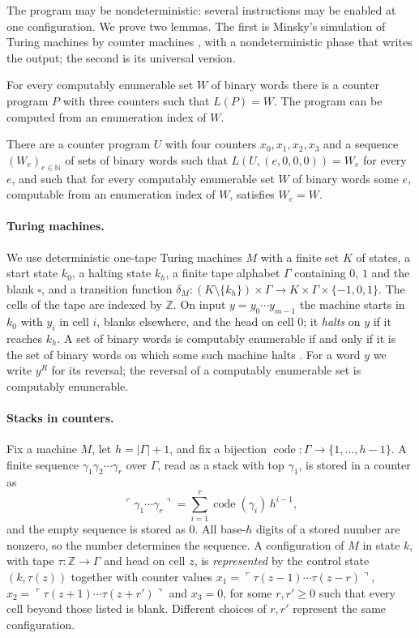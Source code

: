 \documentclass[11pt]{article}
\theoremstyle{plain}
\theoremstyle{definition}
\theoremstyle{remark}
\newcommand{\N}{\mathbb N}
\newcommand{\st}[1]{\ulcorner #1\urcorner}
\newcommand{\code}{\operatorname{code}}
\begin{document}
The program may be nondeterministic: several instructions may be enabled at one configuration. We prove two lemmas. The first is Minsky's simulation of Turing machines by counter machines \cite{Min61,Min67}, with a nondeterministic phase that writes the output; the second is its universal version.

\begin{lemma}\label{lem:program}
For every computably enumerable set $W$ of binary words there is a counter program $P$ with three counters such that $L(P)=W$. The program can be computed from an enumeration index of $W$.
\end{lemma}

\begin{lemma}\label{lem:universal}
There are a counter program $U$ with four counters $x_0,x_1,x_2,x_3$ and a sequence $(W_e)_{e\in\N}$ of sets of binary words such that $L(U,(e,0,0,0))=W_e$ for every $e$, and such that for every computably enumerable set $W$ of binary words some $e$, computable from an enumeration index of $W$, satisfies $W_e=W$.
\end{lemma}

\paragraph{Turing machines.} We use deterministic one-tape Turing machines $M$ with a finite set $K$ of states, a start state $k_0$, a halting state $k_h$, a finite tape alphabet $\Gamma$ containing $0$, $1$ and the blank $\square$, and a transition function $\delta_M\colon(K\setminus\{k_h\})\times\Gamma\to K\times\Gamma\times\{-1,0,1\}$. The cells of the tape are indexed by $\mathbb Z$. On input $y=y_0\cdots y_{m-1}$ the machine starts in $k_0$ with $y_i$ in cell $i$, blanks elsewhere, and the head on cell $0$; it \emph{halts} on $y$ if it reaches $k_h$. A set of binary words is computably enumerable if and only if it is the set of binary words on which some such machine halts \cite{Soa16}. For a word $y$ we write $y^R$ for its reversal; the reversal of a computably enumerable set is computably enumerable.

\paragraph{Stacks in counters.} Fix a machine $M$, let $h=|\Gamma|+1$, and fix a bijection $\code\colon\Gamma\to\{1,\dots,h-1\}$. A finite sequence $\gamma_1\gamma_2\cdots\gamma_r$ over $\Gamma$, read as a stack with top $\gamma_1$, is stored in a counter as
\[
\st{\gamma_1\cdots\gamma_r}=\sum_{i=1}^r\code(\gamma_i)\,h^{i-1},
\]
and the empty sequence is stored as $0$. All base-$h$ digits of a stored number are nonzero, so the number determines the sequence. A configuration of $M$ in state $k$, with tape $\tau\colon\mathbb Z\to\Gamma$ and head on cell $z$, is \emph{represented} by the control state $(k,\tau(z))$ together with counter values $x_1=\st{\tau(z-1)\cdots\tau(z-r)}$, $x_2=\st{\tau(z+1)\cdots\tau(z+r')}$ and $x_3=0$, for some $r,r'\ge0$ such that every cell beyond those listed is blank. Different choices of $r,r'$ represent the same configuration.
\end{document}
